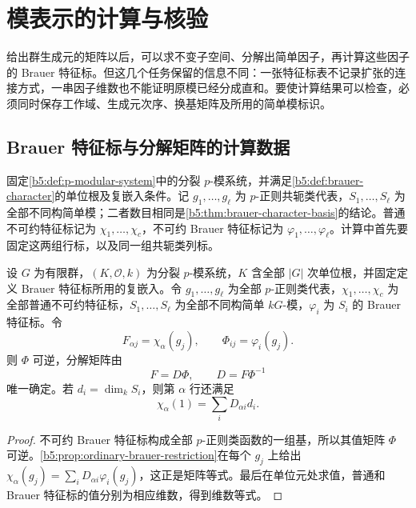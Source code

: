 
\section{模表示的计算与核验}
\label{b5:sec:0807}

给出群生成元的矩阵以后，可以求不变子空间、分解出简单因子，再计算这些因子的 Brauer 特征标。但这几个任务保留的信息不同：一张特征标表不记录扩张的连接方式，一串因子维数也不能证明原模已经分成直和。要使计算结果可以检查，必须同时保存工作域、生成元次序、换基矩阵及所用的简单模标识。

\subsection{Brauer 特征标与分解矩阵的计算数据}
\label{b5:subsec:0807:01}

固定\cref{b5:def:p-modular-system}中的分裂 \(p\)-模系统，并满足\cref{b5:def:brauer-character}的单位根及复嵌入条件。记 \(g_1,\ldots,g_\ell\) 为 \(p\)-正则共轭类代表，\(S_1,\ldots,S_\ell\) 为全部不同构简单模；二者数目相同是\cref{b5:thm:brauer-character-basis}的结论。普通不可约特征标记为 \(\chi_1,\ldots,\chi_c\)，不可约 Brauer 特征标记为 \(\varphi_1,\ldots,\varphi_\ell\)。计算中首先要固定这两组行标，以及同一组共轭类列标。

\begin{proposition}\label{b5:prop:decomposition-data-recovery}
	设 \(G\) 为有限群，\((K,\mathcal O,k)\) 为分裂 \(p\)-模系统，\(K\) 含全部 \(|G|\) 次单位根，并固定定义 Brauer 特征标所用的复嵌入。令 \(g_1,\ldots,g_\ell\) 为全部 \(p\)-正则类代表，\(\chi_1,\ldots,\chi_c\) 为全部普通不可约特征标，\(S_1,\ldots,S_\ell\) 为全部不同构简单 \(kG\)-模，\(\varphi_i\) 为 \(S_i\) 的 Brauer 特征标。令
	\[
		F_{\alpha j}=\chi_\alpha(g_j),\qquad
		\Phi_{ij}=\varphi_i(g_j).
	\]
	则 \(\Phi\) 可逆，分解矩阵由
	\[
		F=D\Phi,\qquad D=F\Phi^{-1}
	\]
	唯一确定。若 \(d_i=\dim_kS_i\)，则第 \(\alpha\) 行还满足
	\[
		\chi_\alpha(1)=\sum_iD_{\alpha i}d_i.
	\]
\end{proposition}
\begin{proof}
	不可约 Brauer 特征标构成全部 \(p\)-正则类函数的一组基，所以其值矩阵 \(\Phi\) 可逆。\cref{b5:prop:ordinary-brauer-restriction}在每个 \(g_j\) 上给出 \(\chi_\alpha(g_j)=\sum_iD_{\alpha i}\varphi_i(g_j)\)，这正是矩阵等式。最后在单位元处求值，普通和 Brauer 特征标的值分别为相应维数，得到维数等式。
\end{proof}

